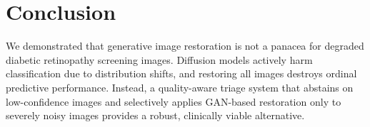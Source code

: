 \documentclass[runningheads]{llncs}
\begin{document}
\section{Conclusion}
We demonstrated that generative image restoration is not a panacea for degraded diabetic retinopathy screening images. Diffusion models actively harm classification due to distribution shifts, and restoring all images destroys ordinal predictive performance. Instead, a quality-aware triage system that abstains on low-confidence images and selectively applies GAN-based restoration only to severely noisy images provides a robust, clinically viable alternative.



\end{document}
